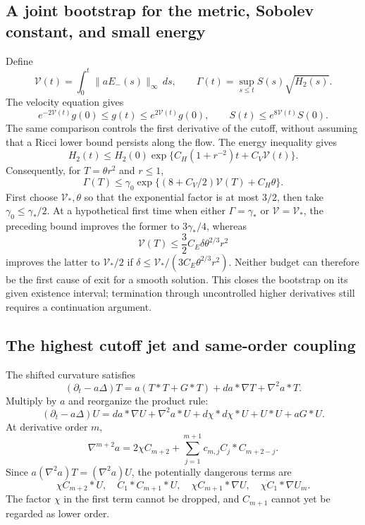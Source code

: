 \documentclass[a4paper,11pt]{article}
\numberwithin{equation}{section}
\theoremstyle{definition}
\begin{document}
\subsection{A joint bootstrap for the metric, Sobolev constant, and small energy}
Define
\[
\mathcal V(t)=\int_0^t\|aE_-(s)\|_\infty\,ds,\qquad
\Gamma(t)=\sup_{s\le t}S(s)\sqrt{H_2(s)}.
\]
The velocity equation gives
\[
e^{-2\mathcal V(t)}g(0)\le g(t)\le e^{2\mathcal V(t)}g(0),
\qquad S(t)\le e^{8\mathcal V(t)}S(0).
\]
The same comparison controls the first derivative of the cutoff, without assuming that a Ricci lower bound persists along the flow.
The energy inequality gives
\[
H_2(t)\le H_2(0)\exp\{C_H(1+r^{-2})t+C_V\mathcal V(t)\}.
\]
Consequently, for $T=\theta r^2$ and $r\le1$,
\[
\Gamma(T)\le\gamma_0
\exp\{(8+C_V/2)\mathcal V(T)+C_H\theta\}.
\]
First choose $\mathcal V_*,\theta$ so that the exponential factor is at most $3/2$,
then take $\gamma_0\le\gamma_*/2$. At a hypothetical first time when either
$\Gamma=\gamma_*$ or $\mathcal V=\mathcal V_*$, the preceding bound improves the former to
$3\gamma_*/4$, whereas
\[
\mathcal V(T)\le\frac32C_E\delta\theta^{2/3}r^2
\]
improves the latter to $\mathcal V_*/2$ if $\delta\le\mathcal V_*/(3C_E\theta^{2/3}r^2)$.
Neither budget can therefore be the first cause of exit for a smooth solution. This closes the bootstrap on its given existence interval; termination through uncontrolled higher derivatives still requires a continuation argument.

\subsection{The highest cutoff jet and same-order coupling}
The shifted curvature satisfies
\[
(\partial_t-a\Delta)T
=a(T*T+G*T)+da*\nabla T+\nabla^2a*T.
\]
Multiply by $a$ and reorganize the product rule:
\[
(\partial_t-a\Delta)U
=da*\nabla U+\nabla^2a*U+d\chi*d\chi*U+U*U+aG*U.
\]
At derivative order $m$,
\[
\nabla^{m+2}a
=2\chi C_{m+2}+\sum_{j=1}^{m+1}c_{m,j}C_j*C_{m+2-j}.
\]
Since $a(\nabla^2a)T=(\nabla^2a)U$, the potentially dangerous terms are
\[
\chi C_{m+2}*U,\quad C_1*C_{m+1}*U,\quad
\chi C_{m+1}*\nabla U,\quad\chi C_1*\nabla U_m.
\]
The factor $\chi$ in the first term cannot be dropped, and $C_{m+1}$ cannot yet be regarded as lower order.
\end{document}
